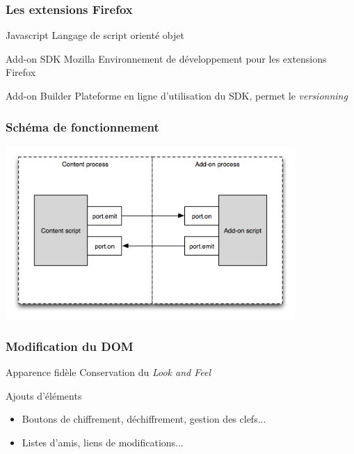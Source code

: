 \documentclass{beamer}
\begin{document}
\begin{frame}
    \frametitle{Les extensions Firefox}
    \begin{block}{Javascript} 
    Langage de script orienté objet
    \end{block}
    \begin{block}{Add-on SDK Mozilla}
    Environnement de développement pour les extensions Firefox
    \end{block}
    \begin{block}{Add-on Builder}
    Plateforme en ligne d'utilisation du SDK, permet le \emph{versionning}
    \end{block}
\end{frame}

\begin{frame}
    \frametitle{Schéma de fonctionnement}
    \begin{center}
    \includegraphics[width=11cm]{content-scripting-events.png}
    \end{center}
\end{frame}

\begin{frame}
    \frametitle{Modification du DOM}
    \begin{block}{Apparence fidèle} 
    Conservation du \emph{Look and Feel}
    \end{block}
    \begin{block}{Ajouts d'éléments}
        \begin{itemize}
            \item{Boutons de chiffrement, déchiffrement, 
            gestion des clefs...}
            \item{Listes d'amis, liens de modifications...}
        \end{itemize}
    \end{block}
\end{frame}
\end{document}
